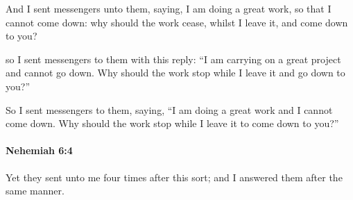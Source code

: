 			\begin{versebox}
					\item[BHS] 
					\item[LXX] 
					\item[ASV] And I sent messengers unto them, saying, I am doing a great work, so that I cannot come down: why should the work cease, whilst I leave it, and come down to you?
					\item[NIV] so I sent messengers to them with this reply: “I am carrying on a great project and cannot go down. Why should the work stop while I leave it and go down to you?”
					\item[NRSV] So I sent messengers to them, saying, “I am doing a great work and I cannot come down. Why should the work stop while I leave it to come down to you?”
			\end{versebox}

		\paragraph{Nehemiah 6:4} %
			\label{NEHEMIAH-6-4}

			Yet they sent unto me four times after this sort; and I answered them after the same manner.

